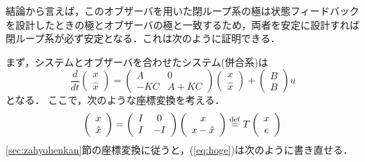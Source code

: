 結論から言えば，このオブザーバを用いた閉ループ系の極は状態フィードバックを設計したときの極とオブザーバの極と一致するため，両者を安定に設計すれば閉ループ系が必ず安定となる．これは次のように証明できる．


まず，システムとオブザーバを合わせたシステム(併合系)は
\begin{equation}
 \frac{d}{dt}
  \left(\begin{array}{c}
         x \\
	 \hat{x}
	\end{array}\right)
  =
  \left(\begin{array}{cc}
         A & 0 \\
	 -KC & A+KC
	\end{array}\right)
  \left(\begin{array}{c}
         x \\
	 \hat{x}
	\end{array}\right)
  +
  \left(\begin{array}{c}
         B \\
	 B
	\end{array}\right)
  u
  \label{eq:hoge}
\end{equation}
となる．
ここで，次のような座標変換を考える．
\begin{equation}
 \left(\begin{array}{c}
         x \\
	 \hat{x}
       \end{array}\right)
 =
 \left(\begin{array}{cc}
        I & 0 \\
	I & -I
       \end{array}\right)
 \left(\begin{array}{c}
         x \\
	 x - \hat{x}
       \end{array}\right)
 \stackrel{\rm def}{=} T
 \left(\begin{array}{c}
         x \\
	 e
       \end{array}\right)
\end{equation}
\ref{sec:zahyohenkan}節の座標変換に従うと，(\ref{eq:hoge})は次のように書き直せる．
